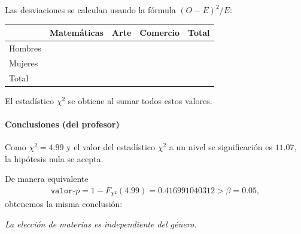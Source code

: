 Las desviaciones se calculan usando la fórmula
$(O-E)^2/E$:
\begin{center}
	\begin{tabular}{|l|l|l|l|l|}\hline
		& Matemáticas & Arte & Comercio & Total\\\hline
		Hombres &  &  &  & \\\hline
		Mujeres &  &  &  & \\\hline
		Total &  &  &  & \\\hline
	\end{tabular}
\end{center}

El estadístico $\chi^{2}$ se obtiene al sumar todos estos valores.

\paragraph{Conclusiones (del profesor)}
Como $\chi^{2}= 4.99$ y el valor del estadístico $\chi^{2}$ a un nivel se significación es $11.07,$ la hipótesis nula se acepta.

De manera equivalente
\begin{align}
	\texttt{valor-}p=1- F_{\chi^{2}}(4.99)=0.416991040312>\beta=0.05,
\end{align}
obtenemos la misma conclusión:
\begin{center}
	\emph{La elección de materias es independiente del género.}
\end{center}


